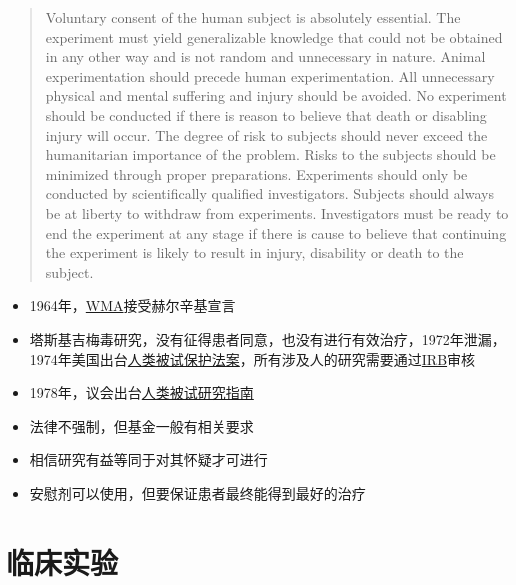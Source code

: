\documentclass[]{book}
\providecommand{\tightlist}{%
  \setlength{\itemsep}{0pt}\setlength{\parskip}{0pt}}
\begin{document}
\begin{quote}
Voluntary consent of the human subject is absolutely essential.
The experiment must yield generalizable knowledge that could not be obtained in any other way and is not random and unnecessary in nature.
Animal experimentation should precede human experimentation.
All unnecessary physical and mental suffering and injury should be avoided.
No experiment should be conducted if there is reason to believe that death or disabling injury will occur.
The degree of risk to subjects should never exceed the humanitarian importance of the problem.
Risks to the subjects should be minimized through proper preparations.
Experiments should only be conducted by scientifically qualified investigators.
Subjects should always be at liberty to withdraw from experiments.
Investigators must be ready to end the experiment at any stage if there is cause to believe that continuing the experiment is likely to result in injury, disability or death to the subject.
\end{quote}

\begin{itemize}
\tightlist
\item
  1964年，\href{http://www.wma.net/en/60about/70history/01declarationHelsinki/index.html}{WMA}接受赫尔辛基宣言
\item
  塔斯基吉梅毒研究，没有征得患者同意，也没有进行有效治疗，1972年泄漏，1974年美国出台\href{http://www.hhs.gov/ohrp/humansubjects/guidance/45cfr46.html}{人类被试保护法案}，所有涉及人的研究需要通过\href{http://www.hhs.gov/ohrp/humansubjects/guidance/45cfr46.html\#46.107}{IRB}审核
\item
  1978年，议会出台\href{http://www.hhs.gov/ohrp/policy/belmont.html}{人类被试研究指南}
\item
  法律不强制，但基金一般有相关要求
\item
  相信研究有益等同于对其怀疑才可进行
\item
  安慰剂可以使用，但要保证患者最终能得到最好的治疗
\end{itemize}

\hypertarget{ux4e34ux5e8aux5b9eux9a8c}{%
\section{临床实验}\label{ux4e34ux5e8aux5b9eux9a8c}}
\end{document}
